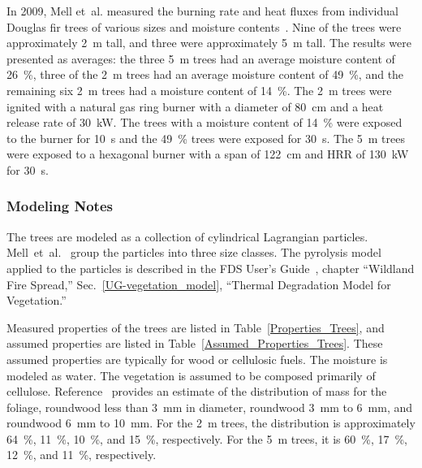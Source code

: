 In 2009, Mell et~al. measured the burning rate and heat fluxes from individual Douglas fir trees of various sizes and moisture contents~\cite{Mell:2009}. Nine of the trees were approximately 2~m tall, and three were approximately 5~m tall. The results were presented as averages: the three 5~m trees had an average moisture content of 26~\%, three of the 2~m trees had an average moisture content of 49~\%, and the remaining six 2~m trees had a moisture content of 14~\%. The 2~m trees were ignited with a natural gas ring burner with a diameter of 80~cm and a heat release rate of 30~kW. The trees with a moisture content of 14~\% were exposed to the burner for 10~s and the 49~\% trees were exposed for 30~s. The 5~m trees were exposed to a hexagonal burner with a span of 122~cm and HRR of 130~kW for 30~s.

\subsubsection{Modeling Notes}

The trees are modeled as a collection of cylindrical Lagrangian particles. Mell~et~al.~\cite{Mell:2009} group the particles into three size classes. The pyrolysis model applied to the particles is described in the FDS User's Guide~\cite{FDS_Users_Guide}, chapter ``Wildland Fire Spread,'' Sec.~\ref{UG-vegetation_model}, ``Thermal Degradation Model for Vegetation.''

Measured properties of the trees are listed in Table~\ref{Properties_Trees}, and assumed properties are listed in Table~\ref{Assumed_Properties_Trees}. These assumed properties are typically for wood or cellulosic fuels. The moisture is modeled as water. The vegetation is assumed to be composed primarily of cellulose. Reference~\cite{Mell:2009} provides an estimate of the distribution of mass for the foliage, roundwood less than 3~mm in diameter, roundwood 3~mm to 6~mm, and roundwood 6~mm to 10~mm. For the 2~m trees, the distribution is approximately 64~\%, 11~\%, 10~\%, and 15~\%, respectively. For the 5~m trees, it is 60~\%, 17~\%, 12~\%, and 11~\%, respectively.

